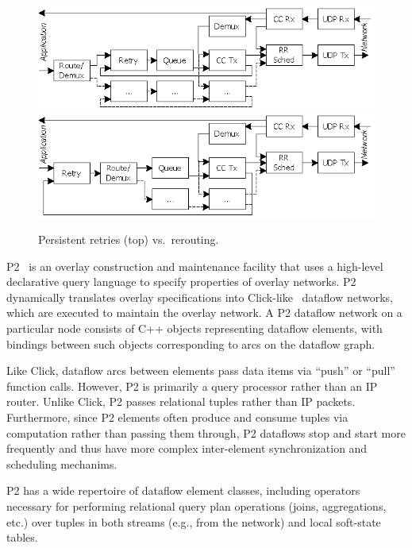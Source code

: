 
\begin{figure}
\center
\includegraphics{transport/ManyRetries}
\includegraphics{transport/SingleRetry}
\caption{Persistent retries (top) vs.\ rerouting.}
\label{fig:RetryOrdering}
\end{figure}

P2~\cite{p2:sosp} is an overlay construction and
maintenance facility that uses a high-level declarative query language
to specify properties of overlay networks.   P2 dynamically translates
overlay specifications into Click-like~\cite{click-tocs} dataflow
networks, which are executed to maintain the overlay network.  A P2
dataflow network on a particular node consists of C++ objects
representing dataflow elements, with bindings between such objects
corresponding to arcs on the dataflow graph.  

Like Click, dataflow arcs between
elements pass data items via ``push'' or ``pull'' function calls.
However, P2 is primarily a query processor rather than an IP router. 
Unlike Click, P2 passes relational tuples rather than IP packets.
Furthermore, since P2 elements often produce and consume tuples via
computation rather than passing them through, P2 dataflows stop and
start more frequently and thus have more complex inter-element
synchronization and scheduling mechanims. 

P2 has a wide repertoire of dataflow element classes, including
operators necessary for performing relational query plan operations
(joins, aggregations, etc.) over tuples in both streams (e.g., from
the network) and local soft-state tables. 

